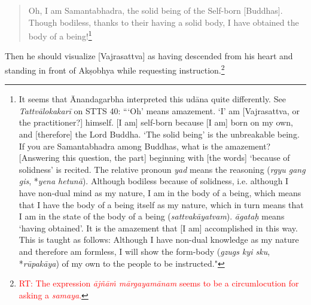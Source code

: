 \documentclass[11pt]{book}
\newcommand{\red}[1]{\textcolor{red}{#1}}
\newcommand{\ttl}[1]{\emph{#1}}
\newcommand{\skt}[1]{\emph{#1}}
\begin{document}
\begin{verse}
Oh, I am Samantabhadra, the solid being of the Self-born [Buddhas]. Though bodiless, thanks to their having a solid body, I have obtained the body of a being!\footnote{It seems that Ānandagarbha interpreted this udāna quite differently. See \ttl{Tattvālokakarī} on  STTS 40: ```Oh' means amazement. `I' am [Vajrasattva, or the practitioner?] himself. [I am] self-born because [I am] born on my own, and [therefore] the Lord Buddha. `The solid being' is the unbreakable being. If you are Samantabhadra among Buddhas, what is the amazement? [Answering this question, the part] beginning with [the words] `because of solidness' is recited. The relative pronoun \skt{yad} means the reasoning (\skt{rgyu gang gis}, *\skt{yena hetunā}). Although bodiless because of solidness, i.e. although I have non-dual mind as my nature, I am in the body of a being, which means that I have the body of a being itself as my nature, which in turn means that I am in the state of the body of a being (\skt{sattvakāyatvam}). \skt{āgataḥ} means `having obtained'. It is the amazement that [I am] accomplished in this way. This is taught as follows: Although I have non-dual knowledge as my nature and therefore am formless, I will show the form-body (\skt{gzugs kyi sku}, *\skt{rūpakāya}) of my own to the people to be instructed."}
\end{verse}

Then he should visualize [Vajrasattva] as having descended from his heart and standing in front of Akṣobhya while requesting instruction.\footnote{\red{RT: The expression \skt{ājñāṁ mārgayamānam} seems to be a circumlocution for asking a \skt{samaya}.}}

\end{document}
